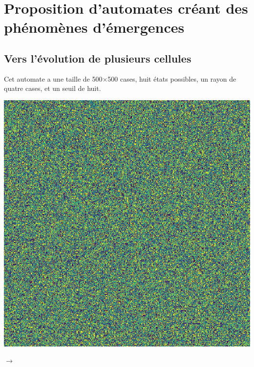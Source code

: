 \documentclass[12pt, a4paper]{article}
\begin{document}
    
    \section{Proposition d'automates créant des phénomènes d'émergences}
        \subsection{Vers l'évolution de plusieurs cellules}
            Cet automate a une taille de 500$\times$500 cases, huit états possibles, un rayon de quatre cases, et un seuil de huit.
            \begin{center}
                \begin{minipage}{.17\linewidth}
                    \includegraphics[scale=0.15]{img/part3/1/step1.png}
                \end{minipage}
                $\rightarrow$
                \begin{minipage}{.17\linewidth}

\end{minipage}
\end{center}
\end{document}
